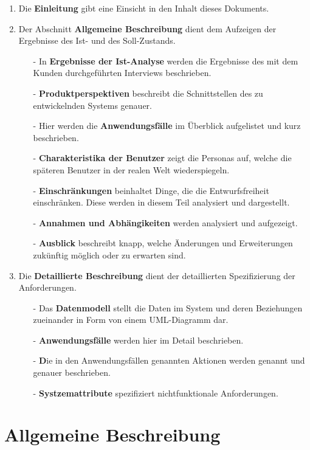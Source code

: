 \documentclass[fontsize=12pt,paper=a4,twoside]{scrartcl}
\begin{document}
\begin{enumerate}
\item Die \textbf{Einleitung} gibt eine Einsicht in den Inhalt dieses Dokuments.
\item Der Abschnitt \textbf{Allgemeine Beschreibung} dient dem Aufzeigen der Ergebnisse des Ist- und des Soll-Zustands.
\begin{itemize}
\item[-]In \textbf{Ergebnisse der Ist-Analyse} werden die Ergebnisse des mit dem Kunden durchgeführten Interviews beschrieben.
\item[-] \textbf{Produktperspektiven} beschreibt die Schnittstellen des zu entwickelnden Systems genauer.
\item[-] Hier werden die \textbf{Anwendungsfälle} im Überblick aufgelistet und kurz beschrieben.
\item[-] \textbf{Charakteristika der Benutzer} zeigt die Personas auf, welche die späteren Benutzer in der realen Welt wiederspiegeln.
\item[-] \textbf{Einschränkungen} beinhaltet Dinge, die die Entwurfsfreiheit einschränken. Diese werden in diesem Teil analysiert und dargestellt.
\item[-] \textbf{Annahmen und Abhängikeiten} werden analysiert und aufgezeigt.
\item[-] \textbf{Ausblick} beschreibt knapp, welche Änderungen und Erweiterungen zukünftig möglich oder zu erwarten sind.
\end{itemize}
\item Die \textbf{Detaillierte Beschreibung} dient der detaillierten Spezifizierung der Anforderungen.
\begin{itemize}
\item[-] Das \textbf{Datenmodell} stellt die Daten im System und deren Beziehungen zueinander in Form von einem UML-Diagramm dar.
\item[-] \textbf{Anwendungsfälle} werden hier im Detail beschrieben.
\item[-] \textbf Die in den Anwendungsfällen genannten {Aktionen} werden genannt und genauer beschrieben.
\item[-] \textbf{Systzemattribute} spezifiziert nichtfunktionale Anforderungen.
\end{itemize}
\end{enumerate}


\section{Allgemeine Beschreibung}
\label{ch:AllgemeineBeschreibung}
\end{document}
